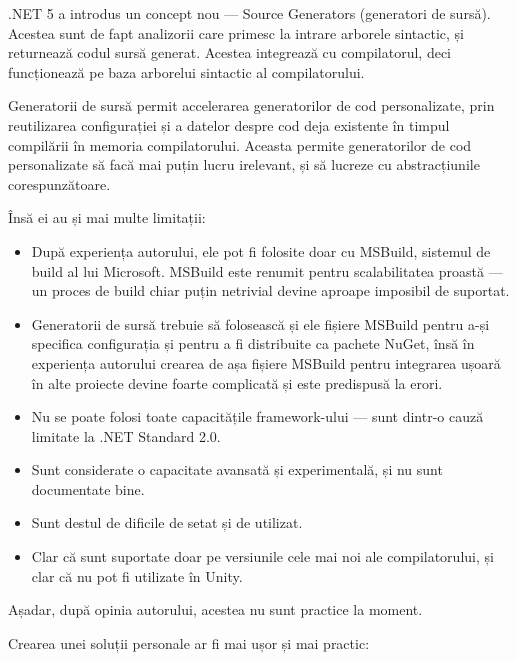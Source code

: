 \documentclass[a4paper,12pt]{report}
\begin{document}
{{.}NET} 5 a introdus un concept nou --- Source Generators (generatori de sursă)\cite{source_generators}.
Acestea sunt de fapt analizorii care primesc la intrare arborele sintactic, și returnează codul sursă generat.
Acestea integrează cu compilatorul, deci funcționează pe baza arborelui sintactic al compilatorului.

Generatorii de sursă permit accelerarea generatorilor de cod personalizate, prin reutilizarea configurației și a datelor despre cod deja existente în timpul compilării în memoria compilatorului.
Aceasta permite generatorilor de cod personalizate să facă mai puțin lucru irelevant, și să lucreze cu abstracțiunile corespunzătoare.

Însă ei au și mai multe limitații:

\begin{itemize}

  \item După experiența autorului, ele pot fi folosite doar cu MSBuild, sistemul de build al lui Microsoft.
  MSBuild este renumit pentru scalabilitatea proastă --- un proces de build chiar puțin netrivial devine aproape imposibil de suportat.

  \item Generatorii de sursă trebuie să folosească și ele fișiere MSBuild pentru a-și specifica configurația\cite{source_generators_msbuild_configuration} și pentru a fi distribuite ca pachete NuGet,
    însă în experiența autorului crearea de așa fișiere MSBuild pentru integrarea ușoară în alte proiecte devine foarte complicată și este predispusă la erori.

  \item Nu se poate folosi toate capacitățile framework-ului --- sunt dintr-o cauză limitate la {{.}NET} Standard 2.0.

  \item Sunt considerate o capacitate avansată și experimentală, și nu sunt documentate bine.

  \item Sunt destul de dificile de setat și de utilizat.

  \item Clar că sunt suportate doar pe versiunile cele mai noi ale compilatorului, și clar că nu pot fi utilizate în Unity.

\end{itemize}

Așadar, după opinia autorului, acestea nu sunt practice la moment.

Crearea unei soluții personale ar fi mai ușor și mai practic:
\end{document}
